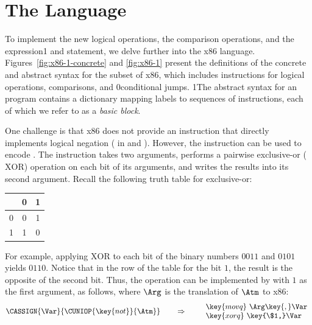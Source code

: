 \documentclass[7x10]{TimesAPriori_MIT}%
\def\racketEd{0}
\def\pythonEd{1}
\def\edition{0}
\newcommand{\racket}[1]{{\if\edition\racketEd{#1}\fi}}
\newcommand{\python}[1]{{\if\edition\pythonEd #1\fi}}
\numberwithin{theorem}{chapter}
\numberwithin{definition}{chapter}
\numberwithin{equation}{chapter}
\begin{document}
\section{The \LangXIf{} Language}
\label{sec:x86-if}

 To implement the new logical operations, the
comparison operations, and the  expression\python{ and
  statement}, we delve further into the x86
language. Figures~\ref{fig:x86-1-concrete} and \ref{fig:x86-1} present
the definitions of the concrete and abstract syntax for the \LangXIf{}
subset of x86, which includes instructions for logical operations,
comparisons, and \racket{conditional} jumps.
%
\python{The abstract syntax for an \LangXIf{} program contains a
  dictionary mapping labels to sequences of instructions, each of
  which we refer to as a \emph{basic block}\index{subject}{basic
    block}.}

One challenge is that x86 does not provide an instruction that
directly implements logical negation ( in \LangIf{} and
\LangCIf{}).  However, the  instruction can be used to
encode .  The  instruction takes two arguments,
performs a pairwise exclusive-or ($\mathrm{XOR}$) operation on each
bit of its arguments, and writes the results into its second argument.
Recall the following truth table for exclusive-or:
\begin{center}
\begin{tabular}{l|cc}
   & 0 & 1 \\ \hline
0  & 0 & 1 \\
1  & 1 & 0
\end{tabular}
\end{center}
For example, applying $\mathrm{XOR}$ to each bit of the binary numbers
$0011$ and $0101$ yields $0110$. Notice that in the row of the table
for the bit $1$, the result is the opposite of the second bit.  Thus,
the  operation can be implemented by  with $1$ as
the first argument, as follows, where $\Arg$ is the translation of
$\Atm$ to x86:
\[
\CASSIGN{\Var}{\CUNIOP{\key{not}}{\Atm}}
\qquad\Rightarrow\qquad
\begin{array}{l}
\key{movq}~ \Arg\key{,} \Var\\
\key{xorq}~ \key{\$1,} \Var
\end{array}
\]

\newcommand{\GrammarXIf}{
\begin{array}{lcl}
  \itm{bytereg} &::=& \key{ah} \MID \key{al} \MID \key{bh} \MID \key{bl}
    \MID \key{ch} \MID \key{cl} \MID \key{dh} \MID \key{dl} \\
\Arg &::=& \key{\%}\itm{bytereg}\\
\itm{cc} & ::= & \key{e} \MID \key{ne} \MID \key{l} \MID \key{le} \MID \key{g} \MID \key{ge} \\
\Instr &::=& \key{xorq}~\Arg\key{,}~\Arg
   \MID \key{cmpq}~\Arg\key{,}~\Arg
    \MID  \key{set}cc~\Arg 
    \MID \key{movzbq}~\Arg\key{,}~\Arg \\
    &\MID& \key{j}cc~\itm{label} \\
\end{array}
}
\end{document}
